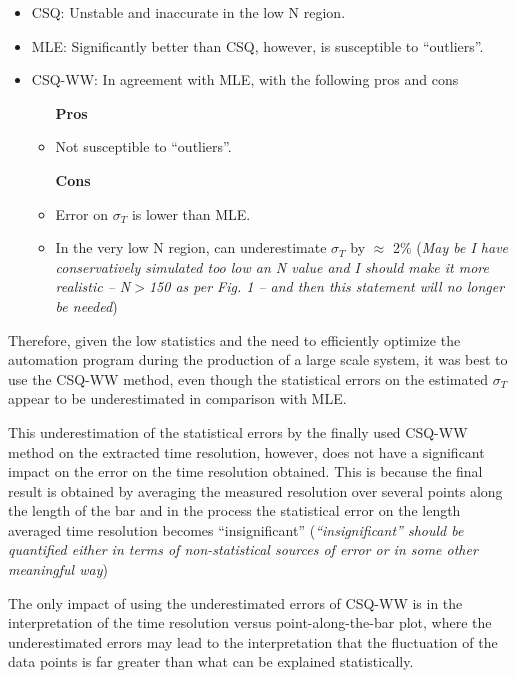 \documentclass[12pt]{article}
\begin{document}
\begin{itemize}
	\item CSQ: Unstable and inaccurate in the low N region. 
	\item MLE: Significantly better than CSQ, however, is susceptible to ``outliers''.
	\item CSQ-WW: In agreement with MLE, with the following pros and cons
		\begin{itemize}
			\item [\textbf{Pros}]
			\item Not susceptible to ``outliers''.
		\end{itemize}
		\begin{itemize}
			\item [\textbf{Cons}]
			\item Error on $\sigma_{T}$ is lower than MLE.
			\item In the very low N region, can underestimate $\sigma_{T}$ by $\approx$ 2\% (\textit{May be I have conservatively simulated too low an N value and I should make it more realistic -- N$>$150 as per Fig. 1 -- and then this statement will no longer be needed})
		\end{itemize}
\end{itemize}

Therefore, given the low statistics and the need to efficiently optimize the automation program during the production of a large scale system, it was best to use the CSQ-WW method, even though the statistical errors on the estimated $\sigma_{T}$ appear to be underestimated in comparison with MLE.

This underestimation of the statistical errors by the finally used CSQ-WW method on the extracted time resolution, however, does not have a significant impact on the error on the time resolution obtained. This is because the final result is obtained by averaging the measured resolution over several points along the length of the bar and in the process the statistical error on the length averaged time resolution becomes ``insignificant'' (\textit{``insignificant'' should be quantified either in terms of non-statistical sources of error or in some other meaningful way})

The only impact of using the underestimated errors of CSQ-WW is in the interpretation of the time resolution versus point-along-the-bar plot, where the underestimated errors may lead to the interpretation that the fluctuation of the data points is far greater than what can be explained statistically. 
\end{document}
